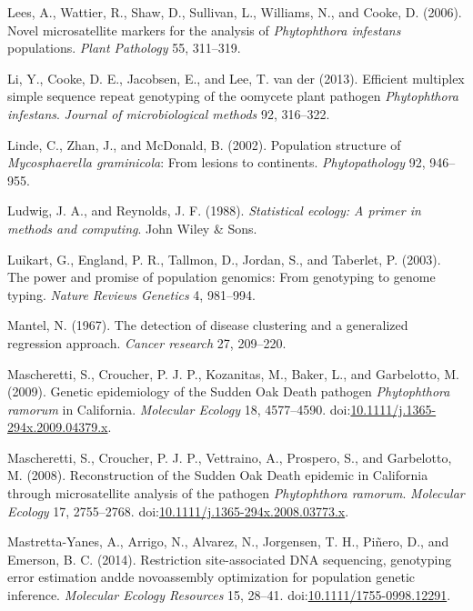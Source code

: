 \documentclass[double,12pt]{beavtex}
\begin{document}
  \hypertarget{ref-lees2006novel}{}
  Lees, A., Wattier, R., Shaw, D., Sullivan, L., Williams, N., and Cooke,
  D. (2006). Novel microsatellite markers for the analysis of
  \emph{Phytophthora infestans} populations. \emph{Plant Pathology} 55,
  311--319.
  
  \hypertarget{ref-li2013efficient}{}
  Li, Y., Cooke, D. E., Jacobsen, E., and Lee, T. van der (2013).
  Efficient multiplex simple sequence repeat genotyping of the oomycete
  plant pathogen \emph{Phytophthora infestans}. \emph{Journal of
  microbiological methods} 92, 316--322.
  
  \hypertarget{ref-linde2002population}{}
  Linde, C., Zhan, J., and McDonald, B. (2002). Population structure of
  \emph{Mycosphaerella graminicola}: From lesions to continents.
  \emph{Phytopathology} 92, 946--955.
  
  \hypertarget{ref-ludwig1988statistical}{}
  Ludwig, J. A., and Reynolds, J. F. (1988). \emph{Statistical ecology: A
  primer in methods and computing}. John Wiley \& Sons.
  
  \hypertarget{ref-luikart2003power}{}
  Luikart, G., England, P. R., Tallmon, D., Jordan, S., and Taberlet, P.
  (2003). The power and promise of population genomics: From genotyping to
  genome typing. \emph{Nature Reviews Genetics} 4, 981--994.
  
  \hypertarget{ref-mantel1967detection}{}
  Mantel, N. (1967). The detection of disease clustering and a generalized
  regression approach. \emph{Cancer research} 27, 209--220.
  
  \hypertarget{ref-mascheretti2009genetic}{}
  Mascheretti, S., Croucher, P. J. P., Kozanitas, M., Baker, L., and
  Garbelotto, M. (2009). Genetic epidemiology of the Sudden Oak Death
  pathogen \emph{Phytophthora ramorum} in California. \emph{Molecular
  Ecology} 18, 4577--4590.
  doi:\href{https://doi.org/10.1111/j.1365-294x.2009.04379.x}{10.1111/j.1365-294x.2009.04379.x}.
  
  \hypertarget{ref-mascheretti2008reconstruction}{}
  Mascheretti, S., Croucher, P. J. P., Vettraino, A., Prospero, S., and
  Garbelotto, M. (2008). Reconstruction of the Sudden Oak Death epidemic
  in California through microsatellite analysis of the pathogen
  \emph{Phytophthora ramorum}. \emph{Molecular Ecology} 17, 2755--2768.
  doi:\href{https://doi.org/10.1111/j.1365-294x.2008.03773.x}{10.1111/j.1365-294x.2008.03773.x}.
  
  \hypertarget{ref-mastretta2015restriction}{}
  Mastretta-Yanes, A., Arrigo, N., Alvarez, N., Jorgensen, T. H., Piñero,
  D., and Emerson, B. C. (2014). Restriction site-associated DNA
  sequencing, genotyping error estimation andde novoassembly optimization
  for population genetic inference. \emph{Molecular Ecology Resources} 15,
  28--41.
  doi:\href{https://doi.org/10.1111/1755-0998.12291}{10.1111/1755-0998.12291}.
  
\end{document}
